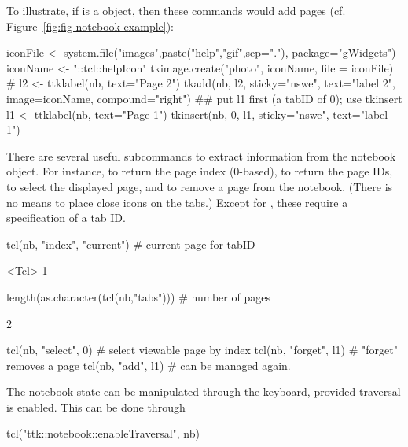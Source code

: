 To illustrate, if  is a  object, then these
commands would add pages (cf. Figure~\ref{fig:fig-notebook-example}):
\begin{Schunk}
\begin{Sinput}
 iconFile <- system.file("images",paste("help","gif",sep="."),
                         package="gWidgets")
 iconName <- "::tcl::helpIcon"
 tkimage.create("photo", iconName, file = iconFile)
 #
 l2 <- ttklabel(nb, text="Page 2")
 tkadd(nb, l2, sticky="nswe", text="label 2", 
     image=iconName, compound="right")
 ## put l1 first (a tabID of 0); use tkinsert
 l1 <- ttklabel(nb, text="Page 1")
 tkinsert(nb, 0, l1, sticky="nswe", text="label 1")
\end{Sinput}
\end{Schunk}
%
There are several useful subcommands to extract information from the
notebook object.  For instance,  to return the page index
(0-based),  to return the page IDs,  to select
the displayed page, and  to remove a page from the
notebook. (There is no means to place close icons on the tabs.)
Except for , these require a specification of a tab ID.
\begin{Schunk}
\begin{Sinput}
 tcl(nb, "index", "current")           # current page for tabID
\end{Sinput}
\begin{Soutput}
<Tcl> 1 
\end{Soutput}
\begin{Sinput}
 length(as.character(tcl(nb,"tabs")))  # number of pages
\end{Sinput}
\begin{Soutput}
[1] 2
\end{Soutput}
\begin{Sinput}
 tcl(nb, "select", 0)        # select viewable page by index
 tcl(nb, "forget", l1)       # "forget" removes a page
 tcl(nb, "add", l1)          # can be managed again.
\end{Sinput}
\end{Schunk}
%

The notebook state can be manipulated through the keyboard, provided traversal is enabled. This can be done through
\begin{Schunk}
\begin{Sinput}
 tcl("ttk::notebook::enableTraversal", nb)
\end{Sinput}
\end{Schunk}

